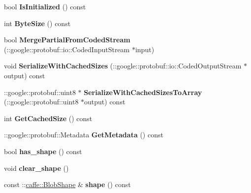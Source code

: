 \begin{DoxyCompactItemize}
bool {\bfseries Is\+Initialized} () const
\item 
\mbox{\label{classcaffe_1_1_reshape_parameter_a2b7471568856e49dbaee951adaaefabd}} 
int {\bfseries Byte\+Size} () const
\item 
\mbox{\label{classcaffe_1_1_reshape_parameter_aaa2e61919f0897125dfc8c995bac551b}} 
bool {\bfseries Merge\+Partial\+From\+Coded\+Stream} (\+::google\+::protobuf\+::io\+::\+Coded\+Input\+Stream $\ast$input)
\item 
\mbox{\label{classcaffe_1_1_reshape_parameter_a652f11b7be649539bf741c815a4f4234}} 
void {\bfseries Serialize\+With\+Cached\+Sizes} (\+::google\+::protobuf\+::io\+::\+Coded\+Output\+Stream $\ast$output) const
\item 
\mbox{\label{classcaffe_1_1_reshape_parameter_a67eab6509dd27cf0878fb590d91f0069}} 
\+::google\+::protobuf\+::uint8 $\ast$ {\bfseries Serialize\+With\+Cached\+Sizes\+To\+Array} (\+::google\+::protobuf\+::uint8 $\ast$output) const
\item 
\mbox{\label{classcaffe_1_1_reshape_parameter_a2a60a9b08b8aabc382f458026931b8cd}} 
int {\bfseries Get\+Cached\+Size} () const
\item 
\mbox{\label{classcaffe_1_1_reshape_parameter_a3f9ef1385362814830d4acf4fe002d9e}} 
\+::google\+::protobuf\+::\+Metadata {\bfseries Get\+Metadata} () const
\item 
\mbox{\label{classcaffe_1_1_reshape_parameter_a52afe248396eb104c1654836b88c4a62}} 
bool {\bfseries has\+\_\+shape} () const
\item 
\mbox{\label{classcaffe_1_1_reshape_parameter_ab07d3b88bc25f07411d11663ba10dcb6}} 
void {\bfseries clear\+\_\+shape} ()
\item 
\mbox{\label{classcaffe_1_1_reshape_parameter_a25716eb2e77553d0ddcddeff51614a6c}} 
const \+::\mbox{\hyperlink{classcaffe_1_1_blob_shape}{caffe\+::\+Blob\+Shape}} \& {\bfseries shape} () const

\end{DoxyCompactItemize}

